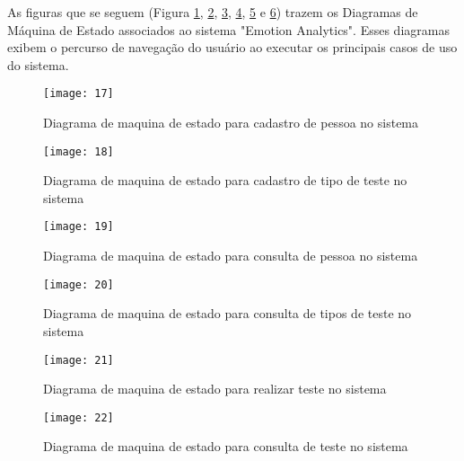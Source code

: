 As figuras que se seguem (Figura \ref{fig:17}, \ref{fig:18}, \ref{fig:19}, \ref{fig:20}, \ref{fig:21} e \ref{fig:22}) trazem os Diagramas de Máquina de Estado associados ao sistema "Emotion Analytics". Esses diagramas exibem o percurso de navegação do usuário ao executar os principais casos de uso do sistema.

\begin{figure}[h]
  \caption{Diagrama de maquina de estado para cadastro de pessoa no sistema}
  \centering
  \texttt{[image: 17]}
  \label{fig:17}
\end{figure}
\FloatBarrier

\begin{figure}[h]
  \caption{Diagrama de maquina de estado para cadastro de tipo de teste no sistema}
  \centering
  \texttt{[image: 18]}
  \label{fig:18}
\end{figure}
\FloatBarrier

\begin{figure}[h]
  \caption{Diagrama de maquina de estado para consulta de pessoa no sistema}
  \centering
  \texttt{[image: 19]}
  \label{fig:19}
\end{figure}
\FloatBarrier

\begin{figure}[h]
  \caption{Diagrama de maquina de estado para consulta de tipos de teste no sistema}
  \centering
  \texttt{[image: 20]}
  \label{fig:20}
\end{figure}
\FloatBarrier

\begin{figure}[h]
  \caption{Diagrama de maquina de estado para realizar teste no sistema}
  \centering
  \texttt{[image: 21]}
  \label{fig:21}
\end{figure}
\FloatBarrier

\begin{figure}[h]
  \caption{Diagrama de maquina de estado para consulta de teste no sistema}
  \centering
  \texttt{[image: 22]}
  \label{fig:22}
\end{figure}
\FloatBarrier
